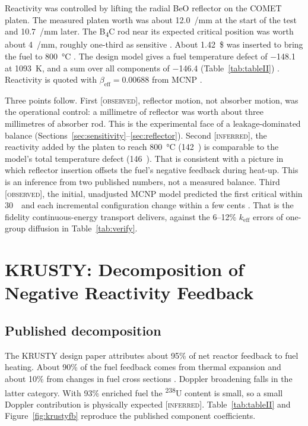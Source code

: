 \documentclass[11pt,letterpaper]{article}
\newcommand{\keff}{k_\mathrm{eff}}
\newcommand{\obs}{\textsc{[observed]}}
\newcommand{\infr}{\textsc{[inferred]}}
\begin{document}
Reactivity was controlled by lifting the radial BeO reflector on the COMET platen. The measured platen worth was about \SI{12.0}{\text{\textcent}/mm} at the start of the test and \SI{10.7}{\text{\textcent}/mm} later. The B\textsubscript{4}C rod near its expected critical position was worth about \SI{4}{\text{\textcent}/mm}, roughly one-third as sensitive \citep{Poston2020Results}. About \SI{1.42}{\$} was inserted to bring the fuel to \SI{800}{\celsius} \citep{Poston2020Results}. The design model gives a fuel temperature defect of \SI{-148.1}{\text{\textcent}} at \SI{1093}{K}, and a sum over all components of \SI{-146.4}{\text{\textcent}} (Table~\ref{tab:tableII}) \citep{Poston2020Design}. Reactivity is quoted with $\beta_\mathrm{eff} = 0.00688$ from MCNP \citep{Poston2020Design}.

Three points follow. First \obs, reflector motion, not absorber motion, was the operational control: a millimetre of reflector was worth about three millimetres of absorber rod. This is the experimental face of a leakage-dominated balance (Sections~\ref{sec:sensitivity}--\ref{sec:reflector}). Second \infr, the reactivity added by the platen to reach \SI{800}{\celsius} (142~\textcent) is comparable to the model's total temperature defect (146~\textcent). That is consistent with a picture in which reflector insertion offsets the fuel's negative feedback during heat-up. This is an inference from two published numbers, not a measured balance. Third \obs, the initial, unadjusted MCNP model predicted the first critical within 30~\textcent\ and each incremental configuration change within a few cents \citep{Poston2020Warm}. That is the fidelity continuous-energy transport delivers, against the 6--12\% $\keff$ errors of one-group diffusion in Table~\ref{tab:verify}.

\section{KRUSTY: Decomposition of Negative Reactivity Feedback}
\label{sec:feedback}

\subsection{Published decomposition}
The KRUSTY design paper attributes about 95\% of net reactor feedback to fuel heating. About 90\% of the fuel feedback comes from thermal expansion and about 10\% from changes in fuel cross sections \citep{Poston2020Design}. Doppler broadening falls in the latter category. With 93\% enriched fuel the \textsuperscript{238}U content is small, so a small Doppler contribution is physically expected \infr. Table~\ref{tab:tableII} and Figure~\ref{fig:krustyfb} reproduce the published component coefficients.
\end{document}
